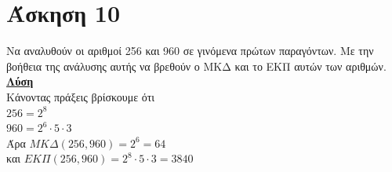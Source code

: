 \documentclass[a4paper,10pt]{report}
\begin{document}
\section*{Άσκηση 10  \hfill \small{}}
Να αναλυθούν οι αριθμοί 256 και 960 σε γινόμενα πρώτων παραγόντων. Με την βοήθεια της ανάλυσης αυτής να βρεθούν 
ο ΜΚΔ και το ΕΚΠ αυτών των αριθμών. \\
\underline{\textbf{Λύση}}\\
Κάνοντας πράξεις βρίσκουμε ότι \\
$256=2^{8}$\\
$960=2^{6}\cdot5\cdot3$\\
Άρα $ΜΚΔ(256,960)=2^{6}=64$\\
και $ΕΚΠ(256,960)=2^{8}\cdot5\cdot3=3840$
\end{document}
